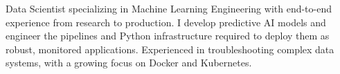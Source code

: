 \begin{cvparagraph}

Data Scientist specializing in Machine Learning Engineering with end-to-end experience from research to production. I develop predictive AI models and engineer the pipelines and Python infrastructure required to deploy them as robust, monitored applications. Experienced in troubleshooting complex data systems, with a growing focus on Docker and Kubernetes.

\end{cvparagraph}
